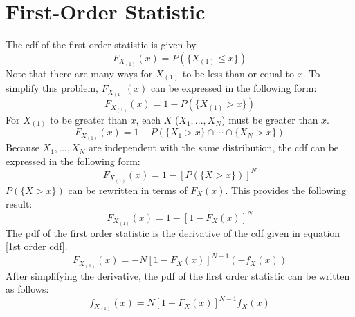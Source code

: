 \documentclass[conference]{IEEEtran}
\begin{document}
\section{First-Order Statistic}
\label{First-Order Statistic Section}
The cdf of the first-order statistic is given by
\begin{equation}
F_{X_{(1)}}(x) = P(\{X_{(1)} \leq x\})
\end{equation}
Note that there are many ways for $X_{(1)}$ to be less than or equal to $x$. To simplify this problem, $F_{X_{(1)}}(x)$ can be expressed in the following form:
\begin{equation}
F_{X_{(1)}}(x) = 1 - P(\{X_{(1)} > x\})
\end{equation}
For $X_{(1)}$ to be greater than $x$, each $X$ ($X_1,...,X_N$) must be greater than $x$.
\begin{equation}
F_{X_{(1)}}(x) = 1 - P(\{X_1 > x \} \cap \cdots \cap \{X_N > x \})
\end{equation}
Because $X_1,...,X_N$ are independent with the same distribution, the cdf can be expressed in the following form:
\begin{equation}
F_{X_{(1)}}(x) = 1 - [P(\{X > x\})]^N
\end{equation}
$P(\{X > x\})$ can be rewritten in terms of $F_X(x)$. This provides the following result:
\begin{equation}
\label{1st order cdf}
F_{X_{(1)}}(x) = 1 - [1 - F_X(x)]^N
\end{equation}
The pdf of the first order statistic is the derivative of the cdf given in equation \eqref{1st order cdf}.
\begin{equation}
F_{X_{(1)}}(x) = -N[1 - F_X(x)]^{N-1}(-f_X(x))
\end{equation}
After simplifying the derivative, the pdf of the first order statistic can be written as follows:
\begin{equation}
f_{X_{(1)}}(x) = N[1 - F_X(x)]^{N-1}f_X(x)
\end{equation}
\end{document}
